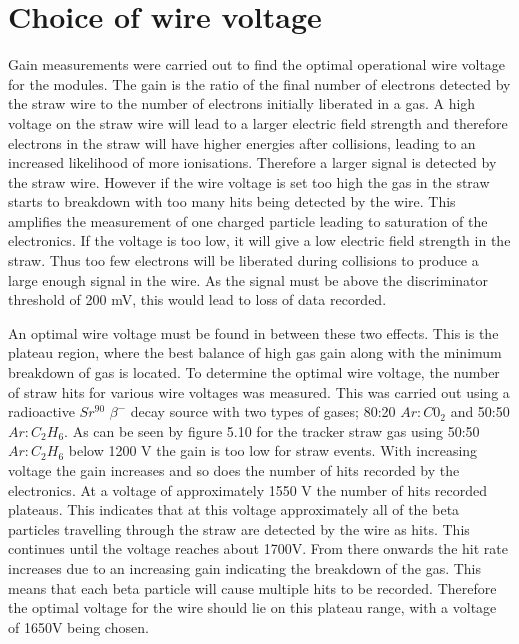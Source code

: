 \section{Choice of wire voltage}

Gain measurements were carried out to find the optimal operational wire voltage for the modules. The gain is the ratio of the final number of electrons detected by the straw wire to the number of electrons initially liberated in a gas. A high voltage on the straw wire will lead to a larger electric field strength and therefore electrons in the straw will have higher energies after collisions, leading to an increased likelihood of more ionisations. Therefore a larger signal is detected by the straw wire. However if the wire voltage is set too high the gas in the straw starts to breakdown with too many hits being detected by the wire. This amplifies the measurement of one charged particle leading to saturation of the electronics. If the voltage is too low, it will give a low electric field strength in the straw. Thus too few electrons will be liberated during collisions to produce a large enough signal in the wire. As the signal must be above the discriminator threshold of 200 mV, this would lead to loss of data recorded.

An optimal wire voltage must be found in between these two effects. This is the plateau region, where the best balance of high gas gain along with the minimum breakdown of gas is located. To determine the optimal wire voltage, the number of straw hits for various wire voltages was measured. This was carried out using a radioactive $Sr^{90}$ $\beta^-$ decay source with two types of gases; 80:20 $Ar:C0_{2}$ and 50:50 $Ar:C_{2}H_{6}$. As can be seen by figure 5.10 for the tracker straw gas using 50:50 $Ar:C_{2}H_{6}$ below 1200 V the gain is too low for straw events. With increasing voltage the gain increases and so does the number of hits recorded by the electronics. At a voltage of approximately 1550 V the number of hits recorded plateaus. This indicates that at this voltage approximately all of the beta particles travelling through the straw are detected by the wire as hits. This continues until the voltage reaches about 1700V. From there onwards the hit rate increases due to an increasing gain indicating the breakdown of the gas. This means that each beta particle will cause multiple hits to be recorded. Therefore the optimal voltage for the wire should lie on this plateau range, with a voltage of 1650V being chosen.

